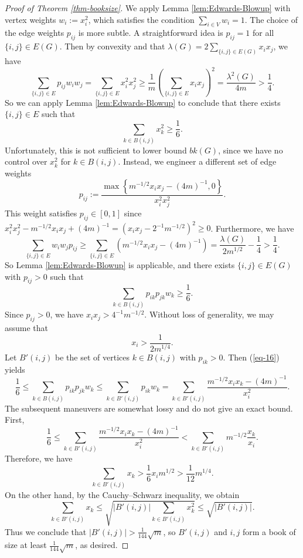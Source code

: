 \documentclass[11pt,a4paper]{article}
\theoremstyle{definition}
\theoremstyle{remark}
\newcommand*{\abs}[1]{\lvert#1\rvert}
\begin{document}
\begin{proof}[Proof of Theorem \ref{thm-booksize}]
We apply Lemma \ref{lem:Edwards-Blowup} with vertex weights $w_i := x_i^2$, which satisfies the condition $\sum_{i\in V} w_i = 1$.
The choice of the edge weights $p_{ij}$ is more subtle. A straightforward idea is $p_{ij} = 1$ for all $\{i, j\}\in E(G)$. Then by convexity and that $\lambda (G) = 2\sum_{\{i,j\}\in E(G)} x_i x_j$, we have
$$\sum_{\{i,j\} \in E} p_{ij} w_i w_j 
= \sum_{\{i,j\} \in E} x_i^2 x_j^2 \geq \frac{1}{m} \left(\sum_{\{i,j\} \in E} x_i x_j \right)^2 = \frac{\lambda^2(G)}{4m} > \frac{1}{4}.$$
So we can apply Lemma \ref{lem:Edwards-Blowup} to conclude that there exists $\{i,j\} \in E$ such that
$$\sum_{k \in B(i, j)} x_k^2 \geq \frac{1}{6}.$$
Unfortunately, this is not sufficient to lower bound $bk(G)$, since we have no control over $x_k^2$ for $k \in B(i, j)$. Instead, we engineer a different set of edge weights
$$p_{ij} := \frac{\max\left\{m^{-1/2} x_i x_j - (4m)^{-1}, 0\right\}}{x_i^2 x_j^2}.$$
This weight satisfies $p_{ij} \in [0, 1]$ since  $x_i^2 x_j^2 - m^{-1/2} x_i x_j + (4m)^{-1} 
= (x_i x_j - 2^{-1}m^{-1/2})^2 \geq 0$. Furthermore, we have
$$\sum_{\{i,j\} \in E} w_i w_j p_{ij} 
\geq \sum_{\{i,j\} \in E} (m^{-1/2} x_i x_j - (4m)^{-1}) = \frac{\lambda(G)}{2m^{1/2}} - \frac{1}{4} > \frac{1}{4}.$$
So Lemma \ref{lem:Edwards-Blowup} is applicable, 
and there exists $\{i,j\} \in E(G)$ with $p_{ij} > 0$ such that
\begin{equation}  \label{eq-16}
\sum_{k \in B(i, j)} p_{ik} p_{jk} w_k 
\geq \frac{1}{6}.
\end{equation}
Since $p_{ij} > 0$, we have $x_i x_j > 4^{-1}m^{-1/2}$. Without loss of generality, we may assume that 
$$x_i > \frac{1}{2m^{1/4}}.$$
Let $B'(i, j)$ be the set of vertices $k \in B(i, j)$ with $p_{ik} > 0$. Then (\ref{eq-16}) yields 
$$\frac{1}{6} \leq \sum_{k \in B(i, j)} p_{ik} p_{jk} w_k \leq \sum_{k \in B'(i, j)} p_{ik} w_k = \sum_{k \in B'(i, j)} \frac{m^{-1/2} x_i x_k - (4m)^{-1}}{x_i^2}.$$
The subsequent maneuvers are somewhat lossy and do not give an exact bound. First,
$$\frac{1}{6} \leq \sum_{k \in B'(i, j)} \frac{m^{-1/2} x_i x_k - (4m)^{-1}}{x_i^2} < \sum_{k \in B'(i, j)} m^{-1/2} \frac{x_k}{x_i}.$$
Therefore, we have
$$\sum_{k \in B'(i, j)} x_k > \frac{1}{6}x_i m^{1/2} > \frac{1}{12} m^{1/4}.$$
On the other hand, by the Cauchy--Schwarz inequality, we obtain
$$\sum_{k \in B'(i, j)} x_k \leq \sqrt{\abs{B'(i, j)} \sum_{k \in B'(i, j)} x_k^2} \leq \sqrt{\abs{B'(i, j)}}.$$
Thus we conclude that $\abs{B'(i, j)} > \frac{1}{144} \sqrt{m}$, so $B'(i, j)$ and $i, j$ form a book of size at least $\frac{1}{144}\sqrt{m}$, as desired.
\end{proof}
\end{document}

